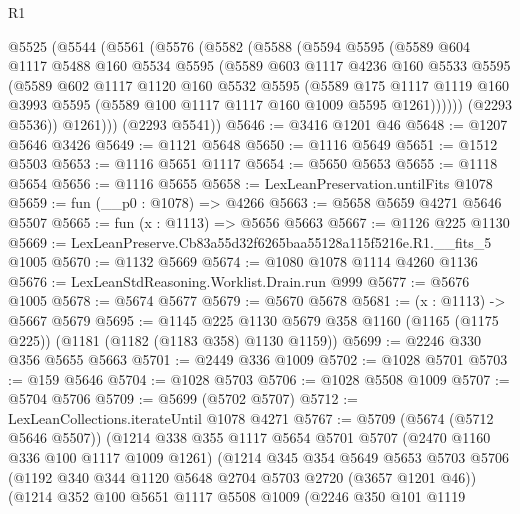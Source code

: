 \begin{lexlean}{R1}
\begin{coremodule}
  @5525
    (@5544
      (@5561
        (@5576
          (@5582
            (@5588
              (@5594
                @5595
                (@5589
                  @604
                  @1117
                  @5488
                  @160
                  @5534
                  @5595
                  (@5589
                    @603
                    @1117
                    @4236
                    @160
                    @5533
                    @5595
                    (@5589
                      @602
                      @1117
                      @1120
                      @160
                      @5532
                      @5595
                      (@5589
                        @175
                        @1117
                        @1119
                        @160
                        @3993
                        @5595
                        (@5589 @100 @1117 @1117 @160 @1009 @5595 @1261))))))
              (@2293 @5536))
            @1261)))
      (@2293 @5541))
@5646 := @3416 @1201 @46
@5648 := @1207 @5646 @3426
@5649 := @1121 @5648
@5650 := @1116 @5649
@5651 := @1512 @5503
@5653 := @1116 @5651 @1117
@5654 := @5650 @5653
@5655 := @1118 @5654
@5656 := @1116 @5655
@5658 := LexLeanPreservation.untilFits @1078
@5659 := fun (__p0 : @1078) => @4266
@5663 := @5658 @5659 @4271 @5646 @5507
@5665 := fun (x : @1113) => @5656 @5663
@5667 := @1126 @225 @1130
@5669 := LexLeanPreserve.Cb83a55d32f6265baa55128a115f5216e.R1.__fits_5 @1005
@5670 := @1132 @5669
@5674 := @1080 @1078 @1114 @4260 @1136
@5676 := LexLeanStdReasoning.Worklist.Drain.run @999
@5677 := @5676 @1005
@5678 := @5674 @5677
@5679 := @5670 @5678
@5681 := (x : @1113) -> @5667 @5679
@5695 := @1145
    @225
    @1130
    @5679
    @358
    @1160
    (@1165 (@1175 @225))
    (@1181 (@1182 (@1183 @358) @1130 @1159))
@5699 := @2246 @330 @356 @5655 @5663
@5701 := @2449 @336 @1009
@5702 := @1028 @5701
@5703 := @159 @5646
@5704 := @1028 @5703
@5706 := @1028 @5508 @1009
@5707 := @5704 @5706
@5709 := @5699 (@5702 @5707)
@5712 := LexLeanCollections.iterateUntil @1078 @4271
@5767 := @5709
    (@5674 (@5712 @5646 @5507))
    (@1214
      @338
      @355
      @1117
      @5654
      @5701
      @5707
      (@2470 @1160 @336 @100 @1117 @1009 @1261)
      (@1214
        @345
        @354
        @5649
        @5653
        @5703
        @5706
        (@1192 @340 @344 @1120 @5648 @2704 @5703 @2720 (@3657 @1201 @46))
        (@1214
          @352
          @100
          @5651
          @1117
          @5508
          @1009
          (@2246
            @350
            @101
            @1119

\end{coremodule}
\end{lexlean}
